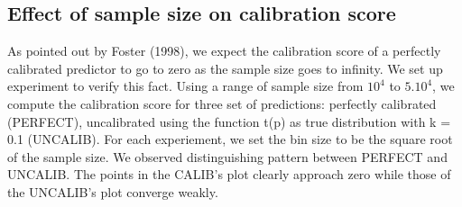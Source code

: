 \subsection{Effect of sample size on calibration score}

As pointed out by Foster (1998), we expect the calibration score of a perfectly calibrated predictor to go to zero as the sample size goes to infinity. We set up experiment to verify this fact. Using a range of sample size from $10^4$ to $5.10^4$, we compute the calibration score for three set of predictions: perfectly calibrated (PERFECT), uncalibrated using the function t(p) as true distribution with k = 0.1 (UNCALIB). For each experiement, we set the bin size to be the square root of the sample size. We observed distinguishing pattern between PERFECT and UNCALIB. The points in the CALIB's plot clearly approach zero while those of the UNCALIB's plot converge weakly. 


